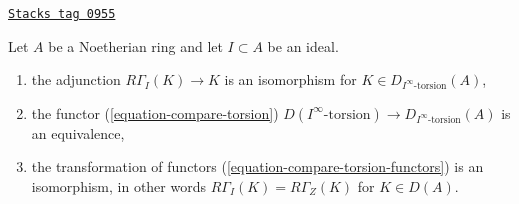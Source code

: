 \begin{lemma}
\label{dualizing-lemma-local-cohomology-noetherian}
\href{https://stacks.math.columbia.edu/tag/0955}{\texttt{Stacks tag 0955}}

Let $A$ be a Noetherian ring and let $I \subset A$ be an ideal.
\begin{enumerate}
\item the adjunction $R\Gamma_I(K) \to K$ is an isomorphism
for $K \in D_{I^\infty\text{-torsion}}(A)$,
\item the functor
(\ref{equation-compare-torsion})
$D(I^\infty\text{-torsion}) \to D_{I^\infty\text{-torsion}}(A)$
is an equivalence,
\item the transformation of functors
(\ref{equation-compare-torsion-functors}) is an isomorphism,
in other words $R\Gamma_I(K) = R\Gamma_Z(K)$ for $K \in D(A)$.
\end{enumerate}
\end{lemma}

